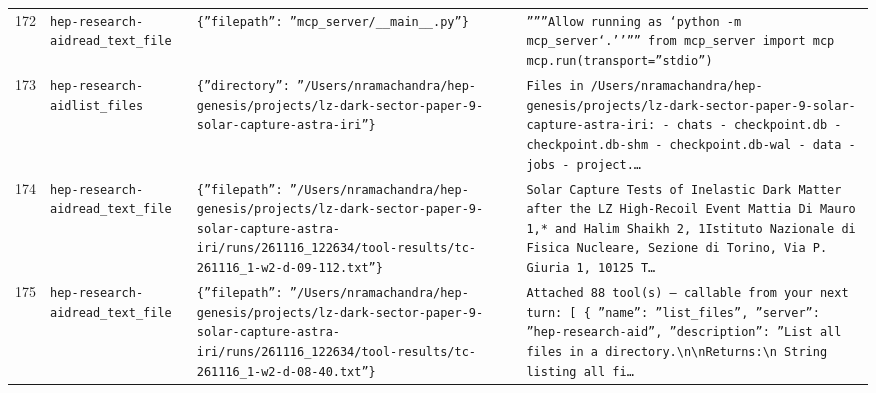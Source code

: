 \documentclass[11pt,a4paper]{article}
\begin{document}
\begin{longtable}{@{}p{}p{}p{}p{}@{}}
172 & \texttt{hep-research-aid}\newline\texttt{read\_\allowbreak{}text\_\allowbreak{}file} & \texttt{\{''filepath'':\allowbreak{} ''mcp\_\allowbreak{}server/\allowbreak{}\_\allowbreak{}\_\allowbreak{}main\_\allowbreak{}\_\allowbreak{}.py''\}\allowbreak{}} & \texttt{''''''Allow running as `python -m mcp\_\allowbreak{}server`.'''''' from mcp\_\allowbreak{}server import mcp  mcp.run(transport=\allowbreak{}''stdio'')\allowbreak{}} \\
173 & \texttt{hep-research-aid}\newline\texttt{list\_\allowbreak{}files} & \texttt{\{''directory'':\allowbreak{} ''/\allowbreak{}Users/\allowbreak{}nramachandra/\allowbreak{}hep-genesis/\allowbreak{}projects/\allowbreak{}lz-dark-sector-paper-9-solar-capture-astra-iri''\}\allowbreak{}} & \texttt{Files in /\allowbreak{}Users/\allowbreak{}nramachandra/\allowbreak{}hep-genesis/\allowbreak{}projects/\allowbreak{}lz-dark-sector-paper-9-solar-capture-astra-iri:\allowbreak{}   - chats   - checkpoint.db   - checkpoint.db-shm   - checkpoint.db-wal   - data   - jobs   - project.\ldots{}\allowbreak{}} \\
174 & \texttt{hep-research-aid}\newline\texttt{read\_\allowbreak{}text\_\allowbreak{}file} & \texttt{\{''filepath'':\allowbreak{} ''/\allowbreak{}Users/\allowbreak{}nramachandra/\allowbreak{}hep-genesis/\allowbreak{}projects/\allowbreak{}lz-dark-sector-paper-9-solar-capture-astra-iri/\allowbreak{}runs/\allowbreak{}261116\_\allowbreak{}122634/\allowbreak{}tool-results/\allowbreak{}tc-261116\_\allowbreak{}1-w2-d-09-112.txt''\}\allowbreak{}} & \texttt{Solar Capture Tests of Inelastic Dark Matter after the LZ High-Recoil Event Mattia Di Mauro 1,\allowbreak{}* and Halim Shaikh 2,\allowbreak{}\dag{}\allowbreak{} 1Istituto Nazionale di Fisica Nucleare,\allowbreak{} Sezione di Torino,\allowbreak{} Via P. Giuria 1,\allowbreak{} 10125 T\ldots{}\allowbreak{}} \\
175 & \texttt{hep-research-aid}\newline\texttt{read\_\allowbreak{}text\_\allowbreak{}file} & \texttt{\{''filepath'':\allowbreak{} ''/\allowbreak{}Users/\allowbreak{}nramachandra/\allowbreak{}hep-genesis/\allowbreak{}projects/\allowbreak{}lz-dark-sector-paper-9-solar-capture-astra-iri/\allowbreak{}runs/\allowbreak{}261116\_\allowbreak{}122634/\allowbreak{}tool-results/\allowbreak{}tc-261116\_\allowbreak{}1-w2-d-08-40.txt''\}\allowbreak{}} & \texttt{Attached 88 tool(s)\allowbreak{} --- callable from your next turn:\allowbreak{} [  \{   ''name'':\allowbreak{} ''list\_\allowbreak{}files'',\allowbreak{}   ''server'':\allowbreak{} ''hep-research-aid'',\allowbreak{}   ''description'':\allowbreak{} ''List all files in a directory.\textbackslash{}\allowbreak{}n\textbackslash{}\allowbreak{}nReturns:\allowbreak{}\textbackslash{}\allowbreak{}n    String listing all fi\ldots{}\allowbreak{}} \\

\end{longtable}
\end{document}
